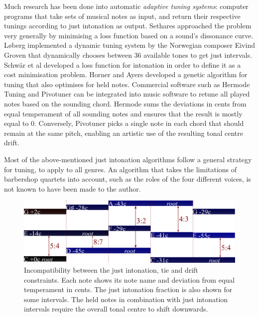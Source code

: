 \documentclass[a4paper]{article}
\begin{document}
Much research has been done into automatic \textit{adaptive tuning systems}: computer programs that take sets of musical notes as input, and return their respective tunings according to just intonation as output. \cite{sethares_adaptive_2005} Sethares \cite{sethares_adaptive_1994} approached the problem very generally by minimising a loss function based on a sound's dissonance curve. Løberg \cite{code_grovenmax_2002} implemented a dynamic tuning system by the Norwegian composer Eivind Groven that dynamically chooses between 36 available tones to get just intervals. Schwär et al \cite{schwar_differentiable_2021} developed a loss function for intonation in order to define it as a cost minimisation problem. Horner and Ayers \cite{horner_common_1996} developed a genetic algorithm for tuning that also optimises for held notes. Commercial software such as Hermode Tuning \cite{mohrlok_hermode_2003} and Pivotuner \cite{volkov_pivotuner_2022} can be integrated into music software to retune all played notes based on the sounding chord. Hermode sums the deviations in cents from equal temperament of all sounding notes and ensures that the result is mostly equal to 0. Conversely, Pivotuner picks a single note in each chord that should remain at the same pitch, enabling an artistic use of the resulting tonal centre drift.

Most of the above-mentioned just intonation algorithms follow a general strategy for tuning, to apply to all genres. An algorithm that takes the limitations of barbershop quartets into account, such as the roles of the four different voices, is not known to have been made to the author.

\begin{figure}
	\centering
	\includegraphics[width=\textwidth]{Figures/ties_vs_ji.pdf}
	\caption{Incompatibility between the just intonation, tie and drift constraints. Each note shows its note name and deviation from equal temperament in cents. The just intonation fraction is also shown for some intervals. The held notes in combination with just intonation intervals require the overall tonal centre to shift downwards.}
	\label{fig:ties_vs_ji}
\end{figure}
\end{document}
